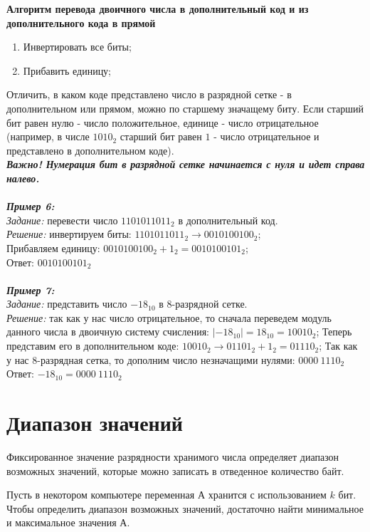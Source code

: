 \begin{center}
  \textbf{Алгоритм перевода двоичного числа в дополнительный код и из дополнительного кода в прямой}
\end{center}
\begin{enumerate}
\item Инвертировать все биты;
\item Прибавить единицу;
\end{enumerate}

Отличить, в каком коде представлено число в разрядной сетке - в дополнительном или прямом, можно по старшему значащему биту. Если старший бит равен нулю - число положительное, единице - число отрицательное (например, в числе $1010_{2}$ старший бит равен $1$ - число отрицательное и представлено в дополнительном коде).
\\\textbf{\emph{Важно! Нумерация бит в разрядной сетке начинается с нуля и идет справа налево.}}
\\
\\\emph{\textbf{Пример 6:}}
\\\emph{Задание:} перевести число $1101011011_{2}$ в дополнительный код.
\\\emph{Решение:} инвертируем биты: $1101011011_{2} \to 0010100100_{2}$;
\\Прибавляем единицу: $0010100100_{2} + 1_{2} = 0010100101_{2}$;
\\Ответ: $0010100101_{2}$
\\
\\\emph{\textbf{Пример 7:}}
\\\emph{Задание:} представить число $-18_{10}$ в 8-разрядной сетке.
\\\emph{Решение:} так как у нас число отрицательное, то сначала переведем модуль данного числа в двоичную систему счисления: $|-18_{10}| = 18_{10} = 10010_{2}$;
Теперь представим его в дополнительном коде: $10010_{2} \to 01101_{2} + 1_{2} = 01110_{2}$;
Так как у нас 8-разрядная сетка, то дополним число незначащими нулями: $0000\ 1110_{2}$
\\Ответ: $-18_{10} = 0000\ 1110_{2}$

\section{Диапазон значений}
Фиксированное значение разрядности хранимого числа определяет диапазон возможных значений, которые можно записать в отведенное количество байт.

Пусть в некотором компьютере переменная А хранится с использованием $k$ бит. Чтобы определить диапазон возможных значений, достаточно найти минимальное и максимальное значения А. 

